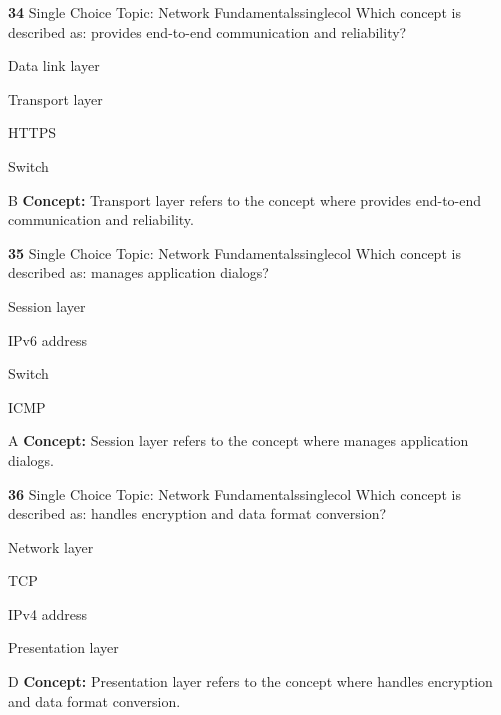 \documentclass[10pt,a4paper]{article}
\begin{document}
\begin{qcard}{\color{white}\textbf{34} \hfill \small Single Choice \textbar{} Topic: Network Fundamentals}{singlecol}
Which concept is described as: provides end-to-end communication and reliability?

\begin{qoptions}
\item Data link layer
\item Transport layer
\item HTTPS
\item Switch
\end{qoptions}
\begin{explainbox}{B}
\textbf{Concept:} Transport layer refers to the concept where provides end-to-end communication and reliability.
\end{explainbox}
\end{qcard}

\begin{qcard}{\color{white}\textbf{35} \hfill \small Single Choice \textbar{} Topic: Network Fundamentals}{singlecol}
Which concept is described as: manages application dialogs?

\begin{qoptions}
\item Session layer
\item IPv6 address
\item Switch
\item ICMP
\end{qoptions}
\begin{explainbox}{A}
\textbf{Concept:} Session layer refers to the concept where manages application dialogs.
\end{explainbox}
\end{qcard}

\begin{qcard}{\color{white}\textbf{36} \hfill \small Single Choice \textbar{} Topic: Network Fundamentals}{singlecol}
Which concept is described as: handles encryption and data format conversion?

\begin{qoptions}
\item Network layer
\item TCP
\item IPv4 address
\item Presentation layer
\end{qoptions}
\begin{explainbox}{D}
\textbf{Concept:} Presentation layer refers to the concept where handles encryption and data format conversion.
\end{explainbox}
\end{qcard}
\end{document}
